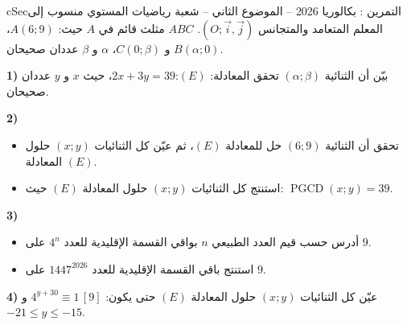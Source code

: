 \documentclass[12pt,a4paper]{article}
\newenvironment{BOX}[2]{\begin{otherlanguage}{english}\begin{arbox}{#1}{#2}}{\end{arbox}\end{otherlanguage}}
\newcounter{exo}
\newenvironment{tamrin}[1]{\stepcounter{exo}\begin{BOX}{cSec}{التمرين \theexo: #1}}{\end{BOX}}
\newcommand{\pgcd}{\operatorname{PGCD}}
\newenvironment{sq}{\begin{itemize}[leftmargin=2.4em,itemsep=3pt]}{\end{itemize}}
\newcommand{\qa}{\item[(أ)]}\newcommand{\qb}{\item[(ب)]}\newcommand{\qc}{\item[(جـ)]}\newcommand{\qd}{\item[(د)]}\newcommand{\qe}{\item[(هـ)]}
\begin{document}
\begin{tamrin}{بكالوريا 2026 -- الموضوع الثاني -- شعبة رياضيات}
المستوي منسوب إلى المعلم المتعامد والمتجانس $(O;\vec i,\vec j)$.
$ABC$ مثلث قائم في $A$ حيث: $A(6;9)$، $B(\alpha;0)$ و $C(0;\beta)$، $\alpha$ و $\beta$ عددان صحيحان.

\textbf{1)} بيّن أن الثنائية $(\alpha;\beta)$ تحقق المعادلة: $(E)$:\quad $2x+3y=39$، حيث $x$ و $y$ عددان صحيحان.

\textbf{2)}
\begin{sq}
\qa تحقق أن الثنائية $(6;9)$ حل للمعادلة $(E)$، ثم عيّن كل الثنائيات $(x;y)$ حلول المعادلة $(E)$.
\qb استنتج كل الثنائيات $(x;y)$ حلول المعادلة $(E)$ حيث: $\pgcd(x;y)=39$.
\end{sq}
\textbf{3)}
\begin{sq}
\qa أدرس حسب قيم العدد الطبيعي $n$ بواقي القسمة الإقليدية للعدد $4^n$ على $9$.
\qb استنتج باقي القسمة الإقليدية للعدد $1447^{2026}$ على $9$.
\end{sq}
\textbf{4)} عيّن كل الثنائيات $(x;y)$ حلول المعادلة $(E)$ حتى يكون: $4^{y+30}\equiv1\,[9]$ و $-21\le y\le -15$.
\end{tamrin}
\end{document}
